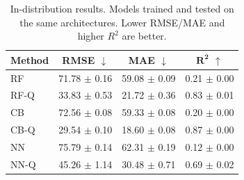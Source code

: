 \begin{table}[t]
    \centering
    \caption{In-distribution results. Models trained and tested on the same architectures. Lower RMSE/MAE and higher $R^2$ are better.}
    \label{tab:id-results}
    \begin{tabular}{lccc}
        \toprule
        \textbf{Method} & \textbf{RMSE} $\downarrow$ & \textbf{MAE} $\downarrow$ & $\boldsymbol{R^2}$ $\uparrow$ \\
        \midrule
        RF      & 71.78 $\pm$ 0.16 & 59.08 $\pm$ 0.09 & 0.21 $\pm$ 0.00 \\
        RF-Q    & 33.83 $\pm$ 0.53 & 21.72 $\pm$ 0.36 & 0.83 $\pm$ 0.01 \\
        \midrule
        CB      & 72.56 $\pm$ 0.08 & 59.33 $\pm$ 0.08 & 0.20 $\pm$ 0.00 \\
        CB-Q    & 29.54 $\pm$ 0.10 & 18.60 $\pm$ 0.08 & 0.87 $\pm$ 0.00 \\
        \midrule
        NN      & 75.79 $\pm$ 0.14 & 62.31 $\pm$ 0.19 & 0.12 $\pm$ 0.00 \\
        NN-Q    & 45.26 $\pm$ 1.14 & 30.48 $\pm$ 0.71 & 0.69 $\pm$ 0.02 \\
        \bottomrule
    \end{tabular}
\end{table}